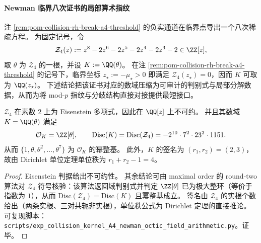 
\paragraph{Newman 临界八次证书的局部算术指纹}
注 \ref{rem:pom-collision-rh-break-a4-threshold} 的负实通道在临界点导出一个八次稀疏方程。
为固定记号，令
\[
\mathcal Z_4(z):=z^8-2z^6-2z^5-2z^4-2z^3-2\in\ZZ[z],
\]
取 \(\theta\) 为 \(\mathcal Z_4\) 的一根，并设
\(
K:=\QQ(\theta)
\)。
在注 \ref{rem:pom-collision-rh-break-a4-threshold} 的记号下，临界坐标 \(z_\star:=-\mu_\star>0\) 即满足 \(\mathcal Z_4(z_\star)=0\)，因而 \(K\) 可取为 \(\QQ(z_\star)\)。
下述结论把该证书对应的数域压缩为可审计的判别式与局部分解数据，从而为将 mod-\(p\) 指纹与分歧结构直接对接提供最短接口。

\begin{proposition}\label{prop:pom-a4t-newman-octic-field-basic}
\(\mathcal Z_4\) 在素数 \(2\) 上为 Eisenstein 多项式，因此在 \(\QQ[z]\) 上不可约。
并且其数域 \(K=\QQ(\theta)\) 满足
\[
\mathcal O_K=\ZZ[\theta],
\qquad
\mathrm{Disc}(K)=\mathrm{Disc}(\mathcal Z_4)=-2^{10}\cdot 7^2\cdot 23^2\cdot 1151.
\]
从而 \(\{1,\theta,\theta^2,\dots,\theta^7\}\) 为 \(\mathcal O_K\) 的幂整基。
此外，\(K\) 的签名为 \((r_1,r_2)=(2,3)\)，故由 Dirichlet 单位定理单位秩为 \(r_1+r_2-1=4\)。
\end{proposition}
\begin{proof}
Eisenstein 判据给出不可约性。
其余结论可由 maximal order 的 round-two 算法对 \(\mathcal Z_4\) 符号核验：该算法返回域判别式并判定 \(\ZZ[\theta]\) 已为极大整环（等价于指数为 \(1\)），从而 \(\mathrm{Disc}(\mathcal Z_4)=\mathrm{Disc}(K)\) 且幂整基成立。
签名由 \(\mathcal Z_4\) 的实根个数给出（两条实根、三对共轭非实根），单位秩公式为 Dirichlet 定理的直接推论。
可复现脚本：\texttt{scripts/exp\_collision\_kernel\_A4\_newman\_octic\_field\_arithmetic.py}。证毕。
\end{proof}

